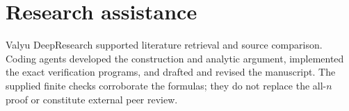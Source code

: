 \documentclass[11pt]{amsart}
\begin{document}
\ifdefined\journalversion
\section*{Research assistance}
Valyu DeepResearch supported literature retrieval and source comparison.
Coding agents developed the construction and analytic
argument, implemented the exact verification programs, and drafted and
revised the manuscript. The supplied finite checks corroborate the formulas;
they do not replace the all-$n$ proof or constitute external peer review.
\fi



\end{document}
